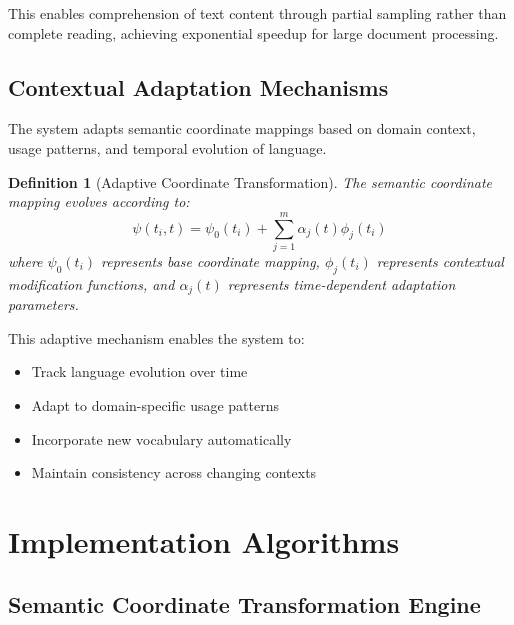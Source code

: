 \documentclass[12pt,a4paper]{article}
\newtheorem{definition}{Definition}
\begin{document}
This enables comprehension of text content through partial sampling rather than complete reading, achieving exponential speedup for large document processing.

\subsection{Contextual Adaptation Mechanisms}

The system adapts semantic coordinate mappings based on domain context, usage patterns, and temporal evolution of language.

\begin{definition}[Adaptive Coordinate Transformation]
The semantic coordinate mapping evolves according to:
\begin{equation}
\psi(t_i, t) = \psi_0(t_i) + \sum_{j=1}^m \alpha_j(t) \phi_j(t_i)
\end{equation}
where $\psi_0(t_i)$ represents base coordinate mapping, $\phi_j(t_i)$ represents contextual modification functions, and $\alpha_j(t)$ represents time-dependent adaptation parameters.
\end{definition}

This adaptive mechanism enables the system to:
\begin{itemize}
\item Track language evolution over time
\item Adapt to domain-specific usage patterns
\item Incorporate new vocabulary automatically
\item Maintain consistency across changing contexts
\end{itemize}

\section{Implementation Algorithms}

\subsection{Semantic Coordinate Transformation Engine}
\end{document}
